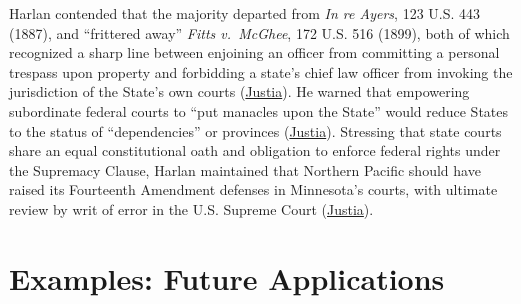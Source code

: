\documentclass[12pt]{article}
\begin{document}
Harlan contended that the majority departed from \textit{In re Ayers}, 123 U.S. 443 (1887), and ``frittered away'' \textit{Fitts v.\ McGhee}, 172 U.S. 516 (1899), both of which recognized a sharp line between enjoining an officer from committing a personal trespass upon property and forbidding a state's chief law officer from invoking the jurisdiction of the State's own courts (\href{https://supreme.justia.com/cases/federal/us/209/123/}{Justia}). He warned that empowering subordinate federal courts to ``put manacles upon the State'' would reduce States to the status of ``dependencies'' or provinces (\href{https://supreme.justia.com/cases/federal/us/209/123/}{Justia}). Stressing that state courts share an equal constitutional oath and obligation to enforce federal rights under the Supremacy Clause, Harlan maintained that Northern Pacific should have raised its Fourteenth Amendment defenses in Minnesota's courts, with ultimate review by writ of error in the U.S. Supreme Court (\href{https://supreme.justia.com/cases/federal/us/209/123/}{Justia}).

\section{Examples: Future Applications}
\end{document}
